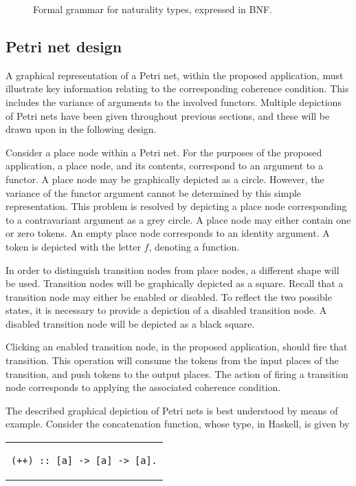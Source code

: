 \documentclass[../Dissertation.tex]{subfiles}
\begin{document}
\begin{figure}[H]

\caption{Formal grammar for naturality types, expressed in BNF.}
\label{fig:natgrammar}
\end{figure}

\subsection{Petri net design}\label{sec:petrinetdesign}
A graphical representation of a Petri net, within the proposed application, must illustrate key information relating to the corresponding coherence condition. This includes the variance of arguments to the involved functors. Multiple depictions of Petri nets have been given throughout previous sections, and these will be drawn upon in the following design.
\par
Consider a place node within a Petri net. For the purposes of the proposed application, a place node, and its contents, correspond to an argument to a functor. A place node may be graphically depicted as a circle. However, the variance of the functor argument cannot be determined by this simple representation. This problem is resolved by depicting a place node corresponding to a contravariant argument as a grey circle. A place node may either contain one or zero tokens. An empty place node corresponds to an identity argument. A token is depicted with the letter $f$, denoting a function.
\par
In order to distinguish transition nodes from place nodes, a different shape will be used. Transition nodes will be graphically depicted as a square. Recall that a transition node may either be enabled or disabled. To reflect the two possible states, it is necessary to provide a depiction of a disabled transition node. A disabled transition node will be depicted as a black square. 
\par
Clicking an enabled transition node, in the proposed application, should fire that transition. This operation will consume the tokens from the input places of the transition, and push tokens to the output places. The action of firing a transition node corresponds to applying the associated coherence condition.
\par
The described graphical depiction of Petri nets is best understood by means of example. Consider the concatenation function, whose type, in Haskell, is given by
\begin{center}
\begin{tabular}{c}
\begin{lstlisting}
(++) :: [a] -> [a] -> [a].
\end{lstlisting}
\end{tabular}
\end{center}
\end{document}
